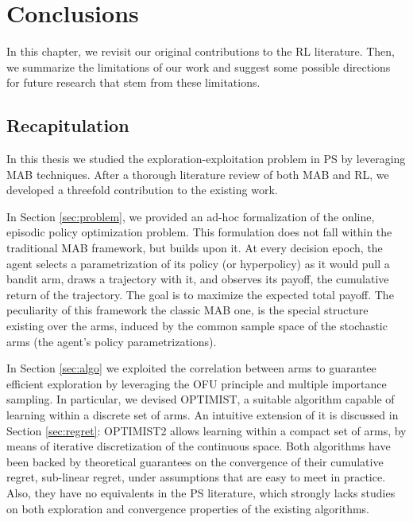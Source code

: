 
\chapter{Conclusions} \label{ch:conclusions}
In this chapter, we revisit our original contributions to the \gls{RL} literature. Then, we summarize the limitations of our work and suggest some possible
directions for future research that stem from these limitations.


\section{Recapitulation}
In this thesis we studied the exploration-exploitation problem in \gls{PS} by leveraging \gls{MAB} techniques. After a thorough literature review of both \gls{MAB} and \gls{RL}, we developed a threefold contribution to the existing work.

In Section \ref{sec:problem}, we provided an ad-hoc formalization of the online, episodic policy optimization problem. This formulation does not fall within the traditional \gls{MAB} framework, but builds upon it. At every decision epoch, the agent selects a parametrization of its policy (or hyperpolicy) as it would pull a bandit arm, draws a trajectory with it, and observes its payoff, \ie the cumulative return of the trajectory. The goal is to maximize the expected total payoff. The peculiarity of this framework \wrt the classic \gls{MAB} one, is the special structure existing over the arms, induced by the common sample space of the stochastic arms (the agent's policy parametrizations).

In Section \ref{sec:algo} we exploited the correlation between arms to guarantee efficient exploration by leveraging the \gls{OFU} principle and multiple importance sampling. In particular, we devised \gls{OPTIMIST}, a suitable algorithm capable of learning within a discrete set of arms. An intuitive extension of it is discussed in Section \ref{sec:regret}: \gls{OPTIMIST}2 allows learning within a compact set of arms, by means of iterative discretization of the continuous space. Both algorithms have been backed by theoretical guarantees on the convergence of their cumulative regret, \ie sub-linear regret, under assumptions that are easy to meet in practice. Also, they have no equivalents in the \gls{PS} literature, which strongly lacks studies on both exploration and convergence properties of the existing algorithms.


